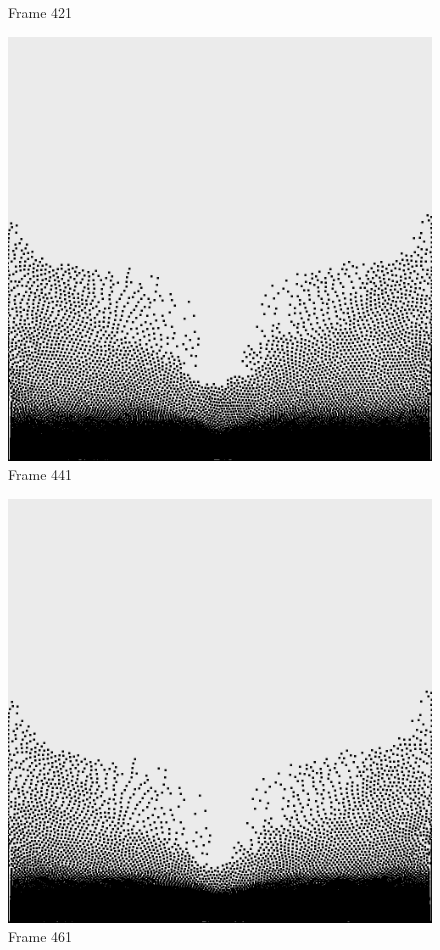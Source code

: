 \documentclass[a4paper, 12pt, oneside]{book}
\begin{document}
\begin{figure}[!ht]
\begin{center}
            Frame 421
        \end{center}
    \endminipage
    \hfill
        \begin{center}
            \includegraphics[width=\linewidth]{images/test_case_1/441.png}
            Frame 441
        \end{center}
    \endminipage
    \hfill
        \begin{center}
            \includegraphics[width=\linewidth]{images/test_case_1/461.png}
            Frame 461
        \end{center}
    \endminipage
    \hfill


\end{figure}
\end{document}
